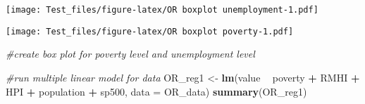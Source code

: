 \documentclass[
]{article}
\newenvironment{Shaded}{\begin{snugshade}}{\end{snugshade}}
\newcommand{\CommentTok}[1]{\textcolor[rgb]{0.56,0.35,0.01}{\textit{#1}}}
\newcommand{\DataTypeTok}[1]{\textcolor[rgb]{0.13,0.29,0.53}{#1}}
\newcommand{\DecValTok}[1]{\textcolor[rgb]{0.00,0.00,0.81}{#1}}
\newcommand{\KeywordTok}[1]{\textcolor[rgb]{0.13,0.29,0.53}{\textbf{#1}}}
\newcommand{\NormalTok}[1]{#1}
\newcommand{\OperatorTok}[1]{\textcolor[rgb]{0.81,0.36,0.00}{\textbf{#1}}}
\newcommand{\StringTok}[1]{\textcolor[rgb]{0.31,0.60,0.02}{#1}}
\begin{document}
\begin{Shaded}
\end{Shaded}

\texttt{[image: Test\_files/figure-latex/OR boxplot unemployment-1.pdf]}

\begin{Shaded}
\end{Shaded}

\texttt{[image: Test\_files/figure-latex/OR boxplot poverty-1.pdf]}

\begin{Shaded}
\begin{Highlighting}[]
\CommentTok{#create box plot for poverty level and unemployment level}
\end{Highlighting}
\end{Shaded}

\begin{Shaded}
\begin{Highlighting}[]
\CommentTok{#run multiple linear model for data}
\NormalTok{OR_reg1 <-}\StringTok{ }\KeywordTok{lm}\NormalTok{(value }\OperatorTok{~}\StringTok{ }\NormalTok{poverty }\OperatorTok{+}\StringTok{ }\NormalTok{RMHI }\OperatorTok{+}\StringTok{ }\NormalTok{HPI }\OperatorTok{+}\StringTok{ }\NormalTok{population }\OperatorTok{+}\StringTok{ }\NormalTok{sp500, }\DataTypeTok{data =}\NormalTok{ OR_data)}
\KeywordTok{summary}\NormalTok{(OR_reg1)}
\end{Highlighting}
\end{Shaded}
\end{document}
